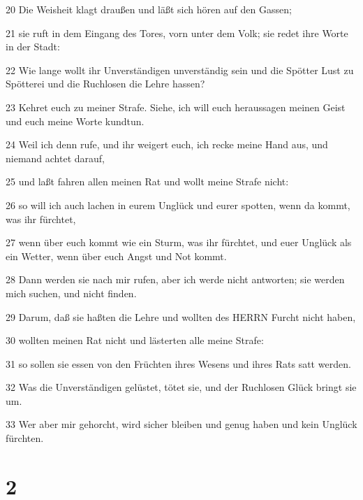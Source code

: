 \par 20 Die Weisheit klagt draußen und läßt sich hören auf den Gassen;
\par 21 sie ruft in dem Eingang des Tores, vorn unter dem Volk; sie redet ihre Worte in der Stadt:
\par 22 Wie lange wollt ihr Unverständigen unverständig sein und die Spötter Lust zu Spötterei und die Ruchlosen die Lehre hassen?
\par 23 Kehret euch zu meiner Strafe. Siehe, ich will euch heraussagen meinen Geist und euch meine Worte kundtun.
\par 24 Weil ich denn rufe, und ihr weigert euch, ich recke meine Hand aus, und niemand achtet darauf,
\par 25 und laßt fahren allen meinen Rat und wollt meine Strafe nicht:
\par 26 so will ich auch lachen in eurem Unglück und eurer spotten, wenn da kommt, was ihr fürchtet,
\par 27 wenn über euch kommt wie ein Sturm, was ihr fürchtet, und euer Unglück als ein Wetter, wenn über euch Angst und Not kommt.
\par 28 Dann werden sie nach mir rufen, aber ich werde nicht antworten; sie werden mich suchen, und nicht finden.
\par 29 Darum, daß sie haßten die Lehre und wollten des HERRN Furcht nicht haben,
\par 30 wollten meinen Rat nicht und lästerten alle meine Strafe:
\par 31 so sollen sie essen von den Früchten ihres Wesens und ihres Rats satt werden.
\par 32 Was die Unverständigen gelüstet, tötet sie, und der Ruchlosen Glück bringt sie um.
\par 33 Wer aber mir gehorcht, wird sicher bleiben und genug haben und kein Unglück fürchten.

\chapter{2}

